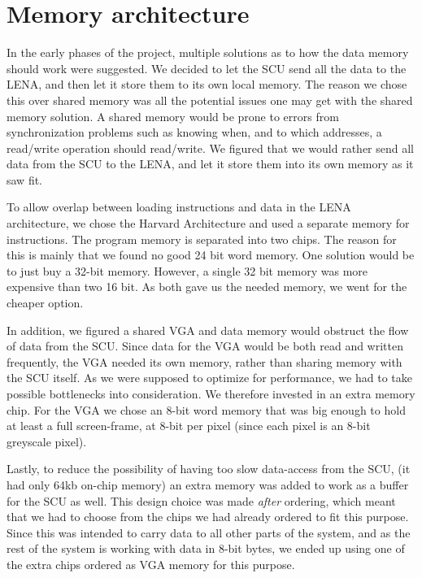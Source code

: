 \section {Memory architecture}
 In the early phases of the project,
multiple solutions as to how the data memory should work were suggested. We
decided to let the \ac{SCU} send all the data to the \ac{LENA}, and then let it store
them to its own local memory. The reason we chose this over shared memory was
all the potential issues one may get with the shared memory solution. A shared memory
would be prone to errors from synchronization problems such as knowing when,
and to which addresses, a read/write operation should read/write. We figured
that we would rather send all data from the \ac{SCU} to the \ac{LENA}, and let it
store them into its own memory as it saw fit.

To allow overlap between loading instructions and data in the LENA
architecture, we chose the Harvard Architecture and used a separate memory for
instructions. The program memory is
separated into two chips. The reason for this is mainly that we found no good 24
bit word memory. One solution would be to just buy a 32-bit memory. However, a single 32
bit memory was more expensive than two 16 bit. As both gave us the needed memory,
we went for the cheaper option.

In addition, we figured a shared \ac{VGA} and data memory would obstruct the flow
of data from the \ac{SCU}. Since data for the \ac{VGA} would be both read and written
frequently, the \ac{VGA} needed its own memory, rather than sharing memory with
the SCU itself. As we were supposed to optimize for performance, we had to take
possible bottlenecks into consideration. We therefore invested in an extra
memory chip. For the VGA we chose an 8-bit word memory that was big enough to
hold at least a full screen-frame, at 8-bit per pixel (since each pixel is an 8-bit greyscale pixel).

Lastly, to reduce the possibility of having too slow data-access from the SCU, (it had only 64kb on-chip memory) 
an extra memory was added to work as a buffer for the SCU as well. This design choice was made {\em after} ordering, 
which meant that we had to choose from the chips we had already ordered to fit this purpose. Since this was intended 
to carry data to all other parts of the system, and as the rest of the system is working with data in 8-bit bytes, 
we ended up using one of the extra chips ordered as \ac{VGA} memory for this purpose.

